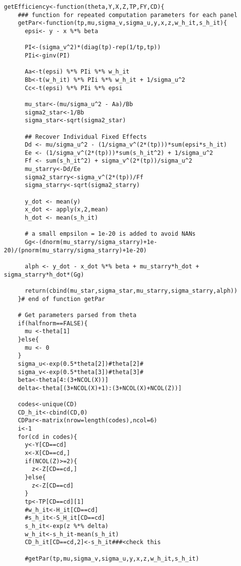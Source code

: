 \begin{lstlisting}[label=Rcode2, caption=R-Code for Efficiency and Fixed Effects Estimation]
    getEfficiency<-function(theta,Y,X,Z,TP,FY,CD){    
    ### function for repeated computation parameters for each panel
    getPar<-function(tp,mu,sigma_v,sigma_u,y,x,z,w_h_it,s_h_it){      
      epsi<- y - x %*% beta    
      
      PI<-(sigma_v^2)*(diag(tp)-rep(1/tp,tp))
      PIi<-ginv(PI)      
      
      Aa<-t(epsi) %*% PIi %*% w_h_it
      Bb<-t(w_h_it) %*% PIi %*% w_h_it + 1/sigma_u^2
      Cc<-t(epsi) %*% PIi %*% epsi
      
      mu_star<-(mu/sigma_u^2 - Aa)/Bb
      sigma2_star<-1/Bb
      sigma_star<-sqrt(sigma2_star)      
      
      ## Recover Individual Fixed Effects
      Dd <- mu/sigma_u^2 - (1/sigma_v^(2*(tp)))*sum(epsi*s_h_it) 
      Ee <- (1/sigma_v^(2*(tp)))*sum(s_h_it^2) + 1/sigma_u^2
      Ff <- sum(s_h_it^2) + sigma_v^(2*(tp))/sigma_u^2
      mu_starry<-Dd/Ee
      sigma2_starry<-sigma_v^(2*(tp))/Ff
      sigma_starry<-sqrt(sigma2_starry)
      
      y_dot <- mean(y)
      x_dot <- apply(x,2,mean)
      h_dot <- mean(s_h_it)
      
      # a small empsilon = 1e-20 is added to avoid NANs
      Gg<-(dnorm(mu_starry/sigma_starry)+1e-20)/(pnorm(mu_starry/sigma_starry)+1e-20)
      
      alph <- y_dot - x_dot %*% beta + mu_starry*h_dot + sigma_starry*h_dot*(Gg) 
      
      return(cbind(mu_star,sigma_star,mu_starry,sigma_starry,alph))       
    }# end of function getPar
    
    # Get parameters parsed from theta    
    if(halfnorm==FALSE){
      mu <-theta[1] 
    }else{
      mu <- 0
    }    
    sigma_u<-exp(0.5*theta[2])#theta[2]#
    sigma_v<-exp(0.5*theta[3])#theta[3]#
    beta<-theta[4:(3+NCOL(X))]
    delta<-theta[(3+NCOL(X)+1):(3+NCOL(X)+NCOL(Z))]
    
    codes<-unique(CD)
    CD_h_it<-cbind(CD,0)
    CDPar<-matrix(nrow=length(codes),ncol=6)
    i<-1
    for(cd in codes){
      y<-Y[CD==cd]
      x<-X[CD==cd,]
      if(NCOL(Z)>=2){
        z<-Z[CD==cd,]
      }else{
        z<-Z[CD==cd]
      }
      tp<-TP[CD==cd][1]
      #w_h_it<-H_it[CD==cd]
      #s_h_it<-S_H_it[CD==cd]
      s_h_it<-exp(z %*% delta)
      w_h_it<-s_h_it-mean(s_h_it)
      CD_h_it[CD==cd,2]<-s_h_it###<check this      
      
      #getPar(tp,mu,sigma_v,sigma_u,y,x,z,w_h_it,s_h_it)
      

\end{lstlisting}
